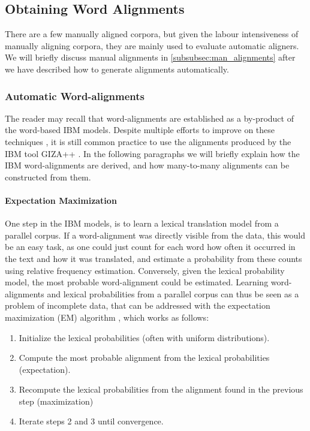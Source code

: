\subsection{Obtaining Word Alignments}

There are a few manually aligned corpora, but given the labour intensiveness of manually aligning corpora, they are mainly used to evaluate automatic aligners. We will briefly discuss manual alignments in \ref{subsubsec:man_alignments} after we have described how to generate alignments automatically.

\subsubsection{Automatic Word-alignments}

The reader may recall that word-alignments are established as a by-product of the word-based IBM models. Despite multiple efforts to improve on these techniques \citep[see][p.119-122 for some examples]{koehn2008statistical}, it is still common practice to use the alignments produced by the IBM tool GIZA++ \citep{koehn2007moses}. In the following 
paragraphs we will briefly explain how the IBM word-alignments are derived, and how many-to-many alignments can be constructed from them.

\paragraph{Expectation Maximization}
One step in the IBM models, is to learn a lexical translation model from a parallel corpus. If a word-alignment was directly visible from the data, this would be an easy task, as one could just count for each word how often it occurred in the text and how it was translated, and estimate a probability from these counts using relative frequency estimation. Conversely, given the lexical probability model, the most probable word-alignment could be estimated. Learning word-alignments and lexical probabilities from a parallel corpus can thus be seen as a problem of incomplete data, that can be addressed with the expectation maximization (EM) algorithm \citep{dempster1977maximum}, which works as follows:\begin{enumerate}
\item Initialize the lexical probabilities (often with uniform distributions).
\item Compute the most probable alignment from the lexical probabilities (expectation).
\item Recompute the lexical probabilities from the alignment found in the previous step (maximization)
\item Iterate steps 2 and 3 until convergence.
\end{enumerate}


